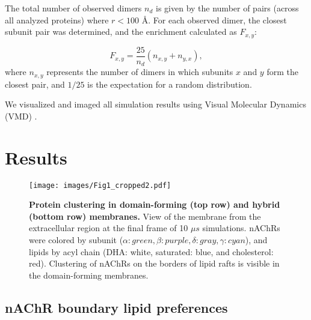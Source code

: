 The total number of observed dimers $n_{d}$ is given by the number of pairs (across all analyzed proteins) where $r<100$ {\AA}. For each observed dimer, the closest subunit pair was determined, and the enrichment calculated as $F_{x,y}$:


  

\begin{equation}\label{eq:subunit}
F_{x,y} = \frac{{25}}{n_{d}}\left({n_{x,y}}+ n_{y,x}\right),
\end{equation}
where $n_{x,y}$ represents the number of dimers in which subunits $x$ and $y$ form the closest pair, and $1/25$ is the expectation for a random distribution.%

We visualized and imaged all simulation results using Visual Molecular Dynamics (VMD) \citep{HUMP96}. 
\section{Results}
\begin{figure}[h]
\center
\texttt{[image: images/Fig1\_cropped2.pdf]}
\caption[Protein clustering in domain-forming (top row) and hybrid (bottom row) membranes.]{{\bf Protein clustering in domain-forming (top row) and hybrid (bottom row) membranes.} View of the membrane from the extracellular region at the final frame of 10 $\mu s$ simulations. nAChRs were colored by subunit ($\alpha:green,\beta:purple,\delta:gray,\gamma:cyan$), and lipids by acyl chain (DHA: white, saturated: blue, and cholesterol: red). Clustering of nAChRs on the borders of lipid rafts is visible in the domain-forming membranes.}
\label{fig:Figure4}
\end{figure}

\subsection{nAChR boundary lipid preferences}\label{sec:lipids}

